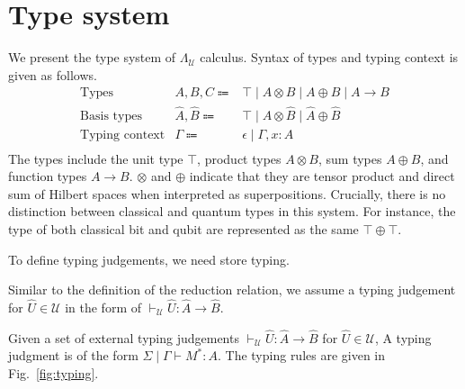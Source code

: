 \section{Type system} \label{sec:type-system}
We present the type system of $\Lambda_\mathcal{U}$ calculus.
Syntax of types and typing context is given as follows.
\begin{equation*}
  \begin{array}{lrl}
    \text{Types}          & A, B, C \Coloneqq          & \top\mid A\otimes B\mid A\oplus B\mid A\rightarrow B    \\
    \text{Basis types}    & \hat{A}, \hat{B} \Coloneqq & \top\mid\hat{A}\otimes \hat{B}\mid\hat{A}\oplus \hat{B} \\
    \text{Typing context} & \Gamma \Coloneqq           & \epsilon \mid \Gamma,x:A                                \\
  \end{array}
\end{equation*}
The types include the unit type $\top$, product types $A \otimes B$, sum types $A \oplus B$, and function types $A \rightarrow B$.
$\otimes$ and $\oplus$ indicate that they are tensor product and direct sum of Hilbert spaces when interpreted as superpositions.
Crucially, there is no distinction between classical and quantum types in this system.
For instance, the type of both classical bit and qubit are represented as the same $\top \oplus \top$.

To define typing judgements, we need store typing.

Similar to the definition of the reduction relation, we assume a typing judgement for $\hat{U}\in\mathcal{U}$ in the form of $\vdash_\mathcal{U} \hat{U} : \hat{A} \rightarrow \hat{B}$.
\begin{dfn}
  Given a set of external typing judgements $\vdash_\mathcal{U} \hat{U} : \hat{A} \rightarrow \hat{B}$ for $\hat{U}\in\mathcal{U}$,
  A typing judgment is of the form $\Sigma \mid \Gamma \vdash M^* : A$.
  The typing rules are given in Fig.~\ref{fig:typing}.
\end{dfn}

